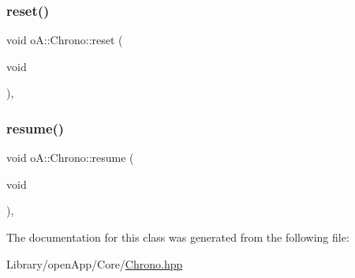 \mbox{\label{classo_a_1_1_chrono_a16943e5e5a0a768cd5b1a7af2deed739}} 
\subsubsection{\texorpdfstring{reset()}{reset()}}
{\footnotesize\ttfamily void o\+A\+::\+Chrono\+::reset (\begin{DoxyParamCaption}\item[{void}]{ }\end{DoxyParamCaption})\hspace{0.3cm}{\ttfamily [inline]}, {\ttfamily [noexcept]}}

\mbox{\label{classo_a_1_1_chrono_a2056863ec3fa0a94ed02fa0393b116e9}} 
\subsubsection{\texorpdfstring{resume()}{resume()}}
{\footnotesize\ttfamily void o\+A\+::\+Chrono\+::resume (\begin{DoxyParamCaption}\item[{void}]{ }\end{DoxyParamCaption})\hspace{0.3cm}{\ttfamily [inline]}, {\ttfamily [noexcept]}}



The documentation for this class was generated from the following file\+:\begin{DoxyCompactItemize}
\item 
Library/open\+App/\+Core/\mbox{\hyperlink{_chrono_8hpp}{Chrono.\+hpp}}\end{DoxyCompactItemize}
